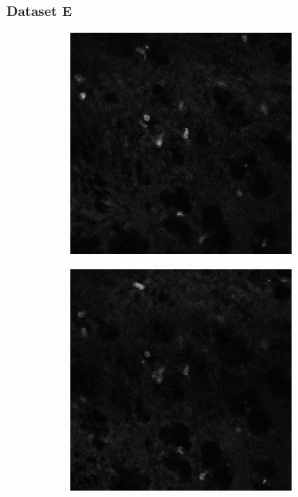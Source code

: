 	\subsubsection{Dataset E}
	\begin{figure}[h]
	
		\begin{subfigure}{.32\textwidth}
		\includegraphics[width=\textwidth]{images/seriesm170_13cropped016}
		\end{subfigure}%
		\hfill
		\begin{subfigure}{.32\textwidth}
		\includegraphics[width=\textwidth]{images/seriesm170_13cropped017}

\end{subfigure}
\end{figure}
